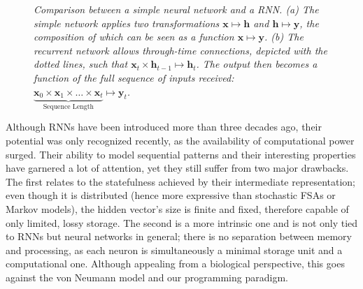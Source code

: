 \documentclass[]{article}
\begin{document}
\begin{figure}[h!]
\begin{minipage}{0.5\textwidth}
	\end{minipage}
	\caption[Hello world]
	{\small \textit{Comparison between a simple neural network and a RNN. (a) The simple network applies two transformations $\pmb{x} \mapsto \pmb{h}$ and $\pmb{h} \mapsto \pmb{y}$, the composition of which can be seen as a function $\pmb{x} \mapsto \pmb{y}$. (b) The recurrent network allows through-time connections, depicted with the dotted lines, such that $\pmb{x}_t \times \pmb{h}_{t-1} \mapsto \pmb{h}_t$. The output then becomes a function of the full sequence of inputs received: $\underbrace{\pmb{x}_0 \times \pmb{x}_1 \times \dots \times \pmb{x}_t}_{\text{Sequence Length}} \mapsto \pmb{y}_t$.}\label{fig:1}}
\end{figure}

Although RNNs have been introduced more than three decades ago, their potential was only recognized recently, as the availability of computational power surged. Their ability to model sequential patterns and their interesting properties have garnered a lot of attention, yet they still suffer from two major drawbacks. The first relates to the statefulness achieved by their intermediate representation; even though it is distributed (hence more expressive than stochastic FSAs or Markov models), the hidden vector's size is finite and fixed, therefore capable of only limited, lossy storage. The second is a more intrinsic one and is not only tied to RNNs but neural networks in general; there is no separation between memory and processing, as each neuron is simultaneously a minimal storage unit and a computational one. Although appealing from a biological perspective, this goes against the von Neumann model and our programming paradigm. 
\end{document}
